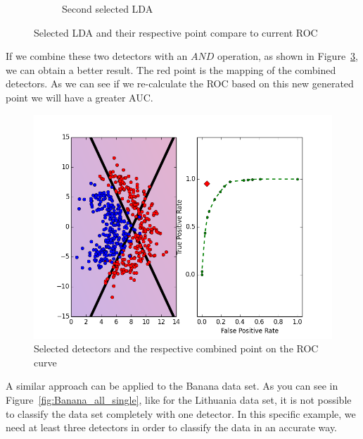 \begin{figure}[H]
\begin{adjustbox}{minipage=\linewidth,scale=1.1}
\begin{subfigure}[b]{0.5\columnwidth}
        \caption{Second selected LDA}
        \label{fig:Dataset_ROC_Lithuanian_b}
    \end{subfigure}
    \caption{Selected LDA and their respective point compare to current ROC}
    \label{fig:Dataset_ROC_Lithuanian}
    \end{adjustbox}
\end{figure}

If we combine these two detectors with an $AND$ operation,  as shown in Figure~\ref{fig::combined_lithuanian_roc}, we can obtain a better result. 
The red point is the mapping of the combined detectors. %
As we can see if we re-calculate the ROC based on this new generated point we will have a greater AUC.

\begin{figure}[H]
\centering
\includegraphics[scale=0.6]{figs/Lithuanian/9999999-combined_All-Classifiers}
\caption{Selected detectors and the respective combined point on the ROC curve} %
\label{fig::combined_lithuanian_roc}
\end{figure}


A similar approach can be applied to the Banana data set. As you can see in Figure~\ref{fig:Banana_all_single}, like for the Lithuania data set, it is not possible to classify the data set completely with one detector.  In this specific example, we need at least three detectors in order to classify the data in an accurate way. 

